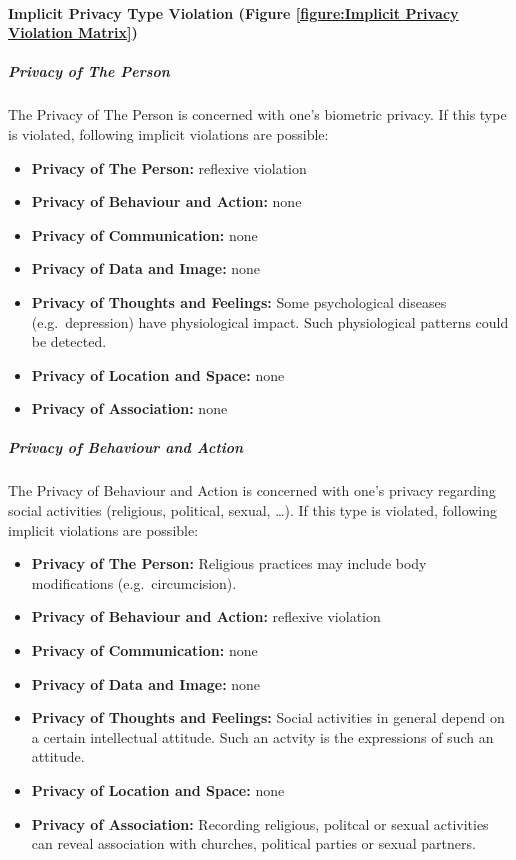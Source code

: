 \paragraph{Implicit Privacy Type Violation (Figure \ref{figure:Implicit Privacy Violation Matrix})}




\subparagraph{Privacy of The Person}

The Privacy of The Person is concerned with one's biometric privacy. If
this type is violated, following implicit violations are possible:

\begin{itemize}
\itemsep1pt\parskip0pt
\item
  \textbf{Privacy of The Person:} reflexive violation
\item
  \textbf{Privacy of Behaviour and Action:} none
\item
  \textbf{Privacy of Communication:} none
\item
  \textbf{Privacy of Data and Image:} none
\item
  \textbf{Privacy of Thoughts and Feelings:} Some psychological diseases
  (e.g.~depression) have physiological impact. Such physiological
  patterns could be detected.
\item
  \textbf{Privacy of Location and Space:} none
\item
  \textbf{Privacy of Association:} none
\end{itemize}

\subparagraph{Privacy of Behaviour and Action}

The Privacy of Behaviour and Action is concerned with one's privacy
regarding social activities (religious, political, sexual, \ldots{}). If
this type is violated, following implicit violations are possible:

\begin{itemize}
\itemsep1pt\parskip0pt
\item
  \textbf{Privacy of The Person:} Religious practices may include body
  modifications (e.g.~circumcision).
\item
  \textbf{Privacy of Behaviour and Action:} reflexive violation
\item
  \textbf{Privacy of Communication:} none
\item
  \textbf{Privacy of Data and Image:} none
\item
  \textbf{Privacy of Thoughts and Feelings:} Social activities in
  general depend on a certain intellectual attitude. Such an actvity is
  the expressions of such an attitude.
\item
  \textbf{Privacy of Location and Space:} none
\item
  \textbf{Privacy of Association:} Recording religious, politcal or
  sexual activities can reveal association with churches, political
  parties or sexual partners.
\end{itemize}

